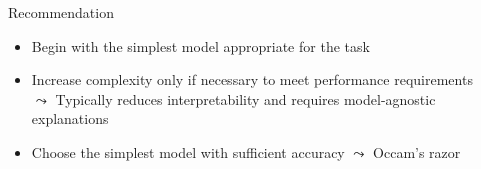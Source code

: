 \documentclass[11pt,compress,t,notes=noshow, aspectratio=169, xcolor=table]{beamer}
\begin{document}
\begin{frame}{Recommendation}
\begin{itemize}
    \item Begin with the simplest model appropriate for the task
    \item Increase complexity only if necessary to meet performance requirements\\
    $\leadsto$ Typically reduces interpretability and requires model-agnostic explanations
    \item Choose the simplest model with sufficient accuracy 
    $\leadsto$ Occam’s razor
\end{itemize}
    \bigskip


\end{frame}
\end{document}
